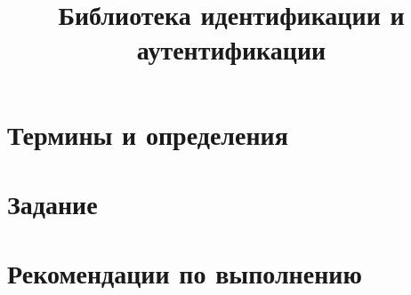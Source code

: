 \documentclass[14pt]{extarticle}
\title{Библиотека идентификации и аутентификации}
\begin{document}
\maketitle

\tableofcontents

\section{Термины и определения}

\section{Задание}

\section{Рекомендации по выполнению}
\end{document}
